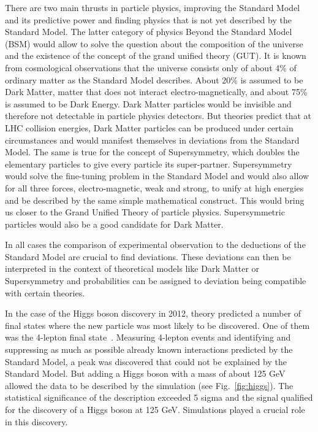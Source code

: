 \documentclass{wscpaperproc}
\theoremstyle{wsc}
\begin{document}
There are two main thrusts in particle physics, improving the Standard Model and its predictive power and finding physics that is not yet described by the Standard Model. The latter category of physics Beyond the Standard Model (BSM) would allow to solve the question about the composition of the universe and the existence of the concept of the grand unified theory (GUT). It is known from cosmological observations that the universe consists only of about 4\% of ordinary matter as the Standard Model describes. About 20\% is assumed to be Dark Matter, matter that does not interact electro-magnetically, and about 75\% is assumed to be Dark Energy. Dark Matter particles would be invisible and therefore not detectable in particle physics detectors. But theories predict that at LHC collision energies, Dark Matter particles can be produced under certain circumstances and would manifest themselves in deviations from the Standard Model. The same is true for the concept of Supersymmetry, which doubles the elementary particles to give every particle its super-partner. Supersymmetry would solve the fine-tuning problem in the Standard Model and would also allow for all three forces, electro-magnetic, weak and strong, to unify at high energies and be described by the same simple mathematical construct. This would bring us closer to the Grand Unified Theory of particle physics. Supersymmetric particles would also be a good candidate for Dark Matter.

In all cases the comparison of experimental observation to the deductions of the Standard Model are crucial to find deviations. These deviations can then be interpreted in the context of theoretical models like Dark Matter or Supersymmetry and probabilities can be assigned to deviation being compatible with certain theories.

In the case of the Higgs boson discovery in 2012, theory predicted a number of final states where the new particle was most likely to be discovered. One of them was the 4-lepton final state~. Measuring 4-lepton events and identifying and suppressing as much as possible already known interactions predicted by the Standard Model, a peak was discovered that could not be explained by the Standard Model. But adding a Higgs boson with a mass of about 125 GeV allowed the data to be described by the simulation (see Fig.~\ref{fig:higgs}). The statistical significance of the description exceeded 5 sigma and the signal qualified for the discovery of a Higgs boson at 125 GeV. Simulations played a crucial role in this discovery.
\end{document}
